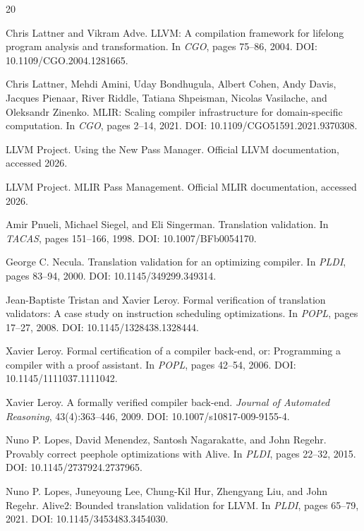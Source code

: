 \begin{thebibliography}{20}

Chris Lattner and Vikram Adve.
\newblock LLVM: A compilation framework for lifelong program analysis and transformation.
\newblock In \emph{CGO}, pages 75--86, 2004. DOI: 10.1109/CGO.2004.1281665.

Chris Lattner, Mehdi Amini, Uday Bondhugula, Albert Cohen, Andy Davis, Jacques Pienaar, River Riddle, Tatiana Shpeisman, Nicolas Vasilache, and Oleksandr Zinenko.
\newblock MLIR: Scaling compiler infrastructure for domain-specific computation.
\newblock In \emph{CGO}, pages 2--14, 2021. DOI: 10.1109/CGO51591.2021.9370308.

LLVM Project.
\newblock Using the New Pass Manager.
\newblock Official LLVM documentation, accessed 2026.

LLVM Project.
\newblock MLIR Pass Management.
\newblock Official MLIR documentation, accessed 2026.

Amir Pnueli, Michael Siegel, and Eli Singerman.
\newblock Translation validation.
\newblock In \emph{TACAS}, pages 151--166, 1998. DOI: 10.1007/BFb0054170.

George C. Necula.
\newblock Translation validation for an optimizing compiler.
\newblock In \emph{PLDI}, pages 83--94, 2000. DOI: 10.1145/349299.349314.

Jean-Baptiste Tristan and Xavier Leroy.
\newblock Formal verification of translation validators: A case study on instruction scheduling optimizations.
\newblock In \emph{POPL}, pages 17--27, 2008. DOI: 10.1145/1328438.1328444.

Xavier Leroy.
\newblock Formal certification of a compiler back-end, or: Programming a compiler with a proof assistant.
\newblock In \emph{POPL}, pages 42--54, 2006. DOI: 10.1145/1111037.1111042.

Xavier Leroy.
\newblock A formally verified compiler back-end.
\newblock \emph{Journal of Automated Reasoning}, 43(4):363--446, 2009. DOI: 10.1007/s10817-009-9155-4.

Nuno P. Lopes, David Menendez, Santosh Nagarakatte, and John Regehr.
\newblock Provably correct peephole optimizations with Alive.
\newblock In \emph{PLDI}, pages 22--32, 2015. DOI: 10.1145/2737924.2737965.

Nuno P. Lopes, Juneyoung Lee, Chung-Kil Hur, Zhengyang Liu, and John Regehr.
\newblock Alive2: Bounded translation validation for LLVM.
\newblock In \emph{PLDI}, pages 65--79, 2021. DOI: 10.1145/3453483.3454030.


\end{thebibliography}
